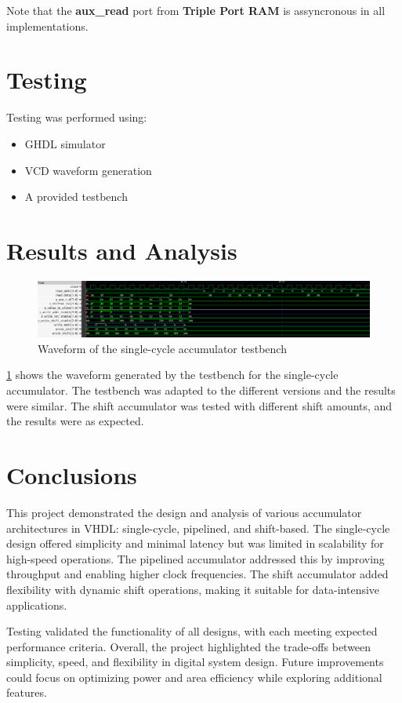 \documentclass[a4paper,12pt]{article}
\begin{document}
Note that the \textbf{aux\_read} port from \textbf{Triple Port RAM} is assyncronous in all implementations.

\section{Testing}
Testing was performed using:
\begin{itemize}
    \item GHDL simulator
    \item VCD waveform generation
    \item A provided testbench  %
\end{itemize}

\section{Results and Analysis}
\begin{figure}[H]
    \centering
    \includegraphics[width=0.8\linewidth]{waveform.png}
    \caption{Waveform of the single-cycle accumulator testbench}
    \label{fig:waveform}
\end{figure}

\ref{fig:waveform} shows the waveform generated by the testbench for the single-cycle accumulator. The testbench was adapted to the different versions and the results were similar. The shift accumulator was tested with different shift amounts, and the results were as expected.

\section{Conclusions}
This project demonstrated the design and analysis of various accumulator architectures in VHDL: single-cycle, pipelined, and shift-based. The single-cycle design offered simplicity and minimal latency but was limited in scalability for high-speed operations. The pipelined accumulator addressed this by improving throughput and enabling higher clock frequencies. The shift accumulator added flexibility with dynamic shift operations, making it suitable for data-intensive applications.

Testing validated the functionality of all designs, with each meeting expected performance criteria. Overall, the project highlighted the trade-offs between simplicity, speed, and flexibility in digital system design. Future improvements could focus on optimizing power and area efficiency while exploring additional features.
\end{document}
